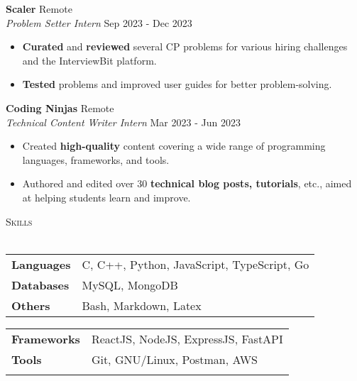 \documentclass[a4paper]{article}
\newcommand{\bulletSep} { \vspace{2mm} }
\newcommand{\sectionSep} { \vspace{3mm} }
\newcommand{\lineunder} {
    \vspace*{-8pt} \\
    \hspace*{-15pt} \hrulefill \\
}
\newcommand{\header} [1] {
    {\hspace*{-18pt}\vspace*{6pt} {
        \fontfamily{qcs}\selectfont \large \scshape #1
    }}
    \vspace*{-6pt} \lineunder
    \vspace{1.1mm}
}
\newcommand{\experienceItem}[5]{
    \textbf{#1} \hfill #2 \\
    \textit{#3} \hfill #4 \\
    #5
}
\begin{document}
\experienceItem{Scaler}{Remote}{Problem Setter Intern}{Sep 2023 - Dec 2023}{
    \begin{itemize}
        \item \textbf{Curated} and \textbf{reviewed} several CP problems for various hiring challenges and the InterviewBit platform.
        \item \textbf{Tested} problems and improved user guides for better problem-solving.
    \end{itemize}
}
\bulletSep

\experienceItem{Coding Ninjas}{Remote}{Technical Content Writer Intern}{Mar 2023 - Jun 2023}{
    \begin{itemize}
        \item Created \textbf{high-quality} content covering a wide range of programming languages, frameworks, and tools.
        \item Authored and edited over 30 \textbf{technical blog posts, tutorials}, etc., aimed at helping students learn and improve.
    \end{itemize}
}

\sectionSep


\header{Skills}
\begin{minipage}[t]{0.51\textwidth}
    \begin{tabular}{@{}ll}
        \textbf{Languages} & C, C++, Python, JavaScript, TypeScript, Go \\
        \textbf{Databases} & MySQL, MongoDB                             \\
        \textbf{Others}    & Bash, Markdown, Latex
    \end{tabular}
\end{minipage}
\hfill
\begin{minipage}[t]{0.47\textwidth}
    \begin{tabular}{@{}ll}
        \textbf{Frameworks} & ReactJS, NodeJS, ExpressJS, FastAPI \\
        \textbf{Tools}      & Git, GNU/Linux, Postman, AWS        \\
        \textbf{}           &                                     \\
    \end{tabular}
\end{minipage}
\sectionSep
\end{document}
